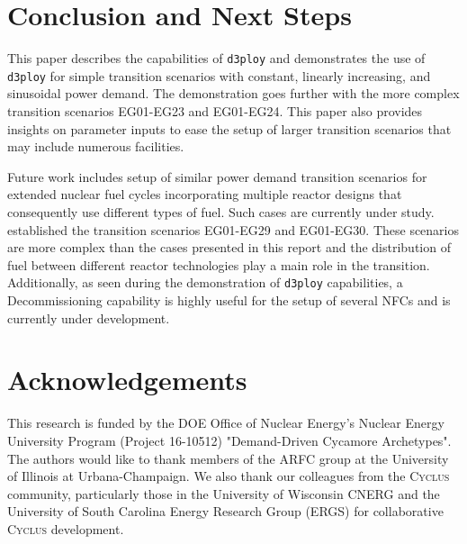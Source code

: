 \documentclass[11pt,letterpaper]{article}
\newcommand{\Cyclus}{\textsc{Cyclus}\xspace}%
\newcommand{\deploy}{\texttt{d3ploy}\xspace}%
\begin{document}
\section{Conclusion and Next Steps}
This paper describes the capabilities of \deploy and demonstrates 
the use of \deploy for simple transition scenarios with 
constant, linearly increasing, and sinusoidal power demand.
The demonstration goes further with the more complex transition
scenarios EG01-EG23 and EG01-EG24. This paper also provides insights on
parameter inputs to ease the setup of larger transition scenarios
that may include numerous facilities.

Future work includes setup of similar power demand transition 
scenarios for extended nuclear fuel cycles incorporating multiple reactor designs that consequently use different types of fuel. Such cases are 
currently under study. \cite{wigeland_nuclear_2014} established the transition
scenarios EG01-EG29 and EG01-EG30. These scenarios are more complex than the
cases presented in this report and the distribution of fuel between different
reactor technologies play a main role in the transition.
Additionally, as seen during the demonstration of \deploy capabilities, a Decommissioning capability is highly useful for the setup of several NFCs and is currently under development.

\section{Acknowledgements}
This research is funded by the \gls{DOE} Office of 
Nuclear Energy's Nuclear Energy University Program (Project 16-10512) 
"Demand-Driven Cycamore Archetypes". The authors would like to thank 
members of the \gls{ARFC} group at the University of Illinois at 
Urbana-Champaign. 
We also thank our colleagues from the \Cyclus community, 
particularly those in the University of Wisconsin 
\gls{CNERG} and the University of South Carolina Energy Research 
Group (ERGS) for collaborative \Cyclus development.

\pagebreak 


\end{document}
